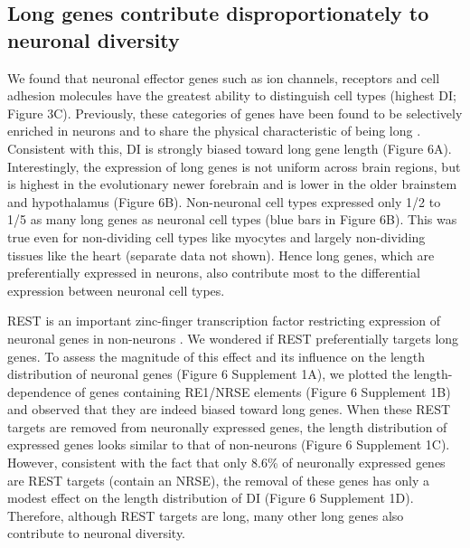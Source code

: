 \subsection{Long genes contribute disproportionately to neuronal diversity}

We found that neuronal effector genes such as ion channels, receptors and cell adhesion molecules have the greatest ability to distinguish cell types (highest DI; Figure 3C). Previously, these categories of genes have been found to be selectively enriched in neurons and to share the physical characteristic of being long \citep{Sugino_2014,Gabel_2015,Zylka_2015}. Consistent with this, DI is strongly biased toward long gene length (Figure 6A). Interestingly, the expression of long genes is not uniform across brain regions, but is highest in the evolutionary newer forebrain and is lower in the older brainstem and hypothalamus (Figure 6B). Non-neuronal cell types expressed only 1/2 to 1/5 as many long genes as neuronal cell types (blue bars in Figure 6B). This was true even for non-dividing cell types like myocytes and largely non-dividing tissues like the heart (separate data not shown). Hence long genes, which are preferentially expressed in neurons, also contribute most to the differential expression between neuronal cell types. 

REST is an important zinc-finger transcription factor restricting expression of neuronal genes in non-neurons \citep{RN1,RN2a}. We wondered if REST preferentially targets long genes. To assess the magnitude of this effect and its influence on the length distribution of neuronal genes (Figure 6 Supplement 1A), we plotted the length-dependence of genes containing RE1/NRSE elements (Figure 6 Supplement 1B) and observed that they are indeed biased toward long genes. When these REST targets are removed from neuronally expressed genes, the length distribution of expressed genes looks similar to that of non-neurons (Figure 6 Supplement 1C). However, consistent with the fact that only 8.6\% of neuronally expressed genes are REST targets (contain an NRSE), the removal of these genes has only a modest effect on the length distribution of DI (Figure 6 Supplement 1D). Therefore, although REST targets are long, many other long genes also contribute to neuronal diversity. %

